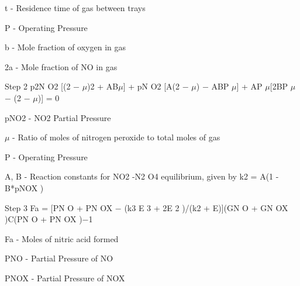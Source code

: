 \documentclass[a4paper,portrait,12pt]{article}
\begin{document}
\begin{flushleft}
t - Residence time of gas between trays
\end{flushleft}


\begin{flushleft}
P - Operating Pressure
\end{flushleft}


\begin{flushleft}
b - Mole fraction of oxygen in gas
\end{flushleft}


\begin{flushleft}
2a - Mole fraction of NO in gas
\end{flushleft}


\begin{flushleft}
Step 2 p2N O2 [(2 $-$ $\mu$)2 + AB$\mu$] + pN O2 [A(2 $-$ $\mu$) $-$ ABP $\mu$] + AP $\mu$[2BP $\mu$ $-$ (2 $-$ $\mu$)] = 0
\end{flushleft}


\begin{flushleft}
pNO2 - NO2 Partial Pressure
\end{flushleft}


\begin{flushleft}
$\mu$ - Ratio of moles of nitrogen peroxide to total moles of gas
\end{flushleft}


\begin{flushleft}
P - Operating Pressure
\end{flushleft}


\begin{flushleft}
A, B - Reaction constants for NO2 -N2 O4 equilibrium, given by k2 = A(1 - B*pNOX )
\end{flushleft}


\begin{flushleft}
Step 3 Fa = [PN O + PN OX $-$ (k3 E 3 + 2E 2 )/(k2 + E)](GN O + GN OX )C(PN O + PN OX )$-$1
\end{flushleft}


\begin{flushleft}
Fa - Moles of nitric acid formed
\end{flushleft}


\begin{flushleft}
PNO - Partial Pressure of NO
\end{flushleft}


\begin{flushleft}
PNOX - Partial Pressure of NOX
\end{flushleft}
\end{document}

